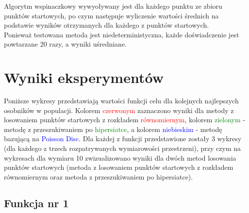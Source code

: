 \documentclass{article}
\begin{document}
Algorytm wspinaczkowy wywyoływany jest dla każdego punktu ze zbioru punktów startowych, po czym następuje wyliczenie wartości średnich na podstawie wyników otrzymanych dla każdego z punktów startowych.\\
Ponieważ testowana metoda jest niedeterministyczna, każde doświadczenie jest powtarzane 20 razy, a wyniki uśredniane.\\


\section{Wyniki eksperymentów}
Poniższe wykresy przedstawiają wartości funkcji celu dla kolejnych najlepszych osobników w populacji. Kolorem \textcolor{red}{czerwonym} zaznaczono wyniki dla metody z losowaniem punktów startowych z rozkładem \textcolor{red}{równomiernym}, kolorem \textcolor{green}{zielonym} - metodę z przeszukiwaniem po \textcolor{green}{hipersiatce}, a kolorem \textcolor{blue}{niebieskim} - metodę bazującą na \textcolor{blue}{Poisson Disc}. Dla każdej z funkcji przedstawione zostały 3 wykresy (dla każdego z trzech rozpatrywanych wymiarowości przestrzeni), przy czym na wykresach dla wymiaru 10 zwizualizowano wyniki dla dwóch metod losowania punktów startowych (metoda z losowaniem punktów startowych z rozkładem równomiernym oraz metoda z przeszukiwaniem po hipersiatce).
\newpage

\subsection{Funkcja nr 1}
\end{document}
